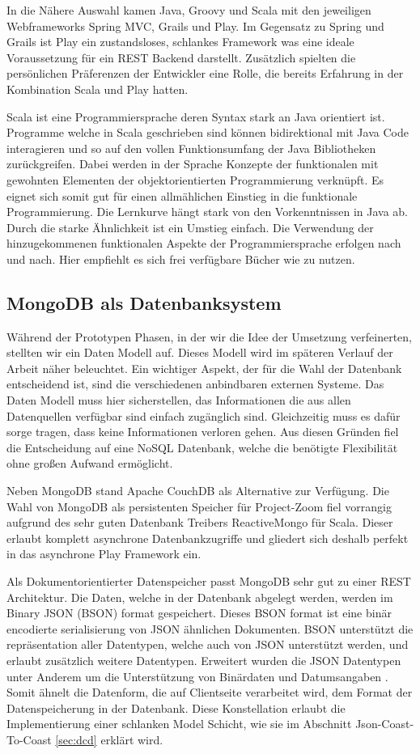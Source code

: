 In die Nähere Auswahl kamen Java, Groovy und Scala mit den jeweiligen Webframeworks Spring MVC, Grails und Play. Im Gegensatz zu Spring und Grails ist Play ein zustandsloses, schlankes Framework was eine ideale Voraussetzung für ein REST Backend darstellt. Zusätzlich spielten die persönlichen Präferenzen der Entwickler eine Rolle, die bereits Erfahrung in der Kombination Scala und Play hatten.

Scala ist eine Programmiersprache deren Syntax stark an Java orientiert ist. Programme welche in Scala geschrieben sind können bidirektional mit Java Code interagieren und so auf den vollen Funktionsumfang der Java Bibliotheken zurückgreifen. Dabei werden in der Sprache Konzepte der funktionalen mit gewohnten Elementen der objektorientierten Programmierung verknüpft. Es eignet sich somit gut für einen allmählichen Einstieg in die funktionale Programmierung. Die Lernkurve hängt stark von den Vorkenntnissen in Java ab. Durch die starke Ähnlichkeit ist ein Umstieg einfach. Die Verwendung der hinzugekommenen funktionalen Aspekte der Programmiersprache erfolgen nach und nach. Hier empfiehlt es sich frei verfügbare Bücher wie \cite{scala-by-example} zu nutzen.

\subsection{MongoDB als Datenbanksystem}
Während der Prototypen Phasen, in der wir die Idee der Umsetzung verfeinerten, stellten wir ein Daten Modell auf. Dieses Modell wird im späteren Verlauf der Arbeit näher beleuchtet. Ein wichtiger Aspekt, der für die Wahl der Datenbank entscheidend ist, sind die verschiedenen anbindbaren externen Systeme. Das Daten Modell muss hier sicherstellen, das Informationen die aus allen Datenquellen verfügbar sind einfach zugänglich sind. Gleichzeitig muss es dafür sorge tragen, dass keine Informationen verloren gehen. Aus diesen Gründen fiel die Entscheidung auf eine NoSQL Datenbank, welche die benötigte Flexibilität ohne großen Aufwand ermöglicht.

Neben MongoDB stand Apache CouchDB als Alternative zur Verfügung. Die Wahl von MongoDB als persistenten Speicher für Project-Zoom fiel vorrangig aufgrund des sehr guten Datenbank Treibers ReactiveMongo für Scala. Dieser erlaubt komplett asynchrone Datenbankzugriffe und gliedert sich deshalb perfekt in das asynchrone Play Framework ein.

Als Dokumentorientierter Datenspeicher passt MongoDB sehr gut zu einer REST Architektur. Die Daten, welche in der Datenbank abgelegt werden, werden im Binary JSON (BSON) format gespeichert. Dieses BSON format ist eine binär encodierte serialisierung von JSON ähnlichen Dokumenten. BSON unterstützt die repräsentation aller Datentypen, welche auch von JSON unterstützt werden, und erlaubt zusätzlich weitere Datentypen. Erweitert wurden die JSON Datentypen unter Anderem um die Unterstützung von Binärdaten und Datumsangaben \cite{bson}. Somit ähnelt die Datenform, die auf Clientseite verarbeitet wird, dem Format der Datenspeicherung in der Datenbank. Diese Konstellation erlaubt die Implementierung einer schlanken Model Schicht, wie sie im Abschnitt Json-Coast-To-Coast \ref{sec:dcd} erklärt wird.

